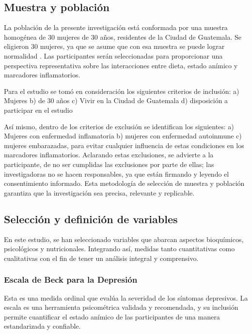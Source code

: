 \documentclass[jou]{apa7}
\begin{document}
	\subsection{Muestra y población}\label{muestra-y-poblaciuxf3n}
	
	La población de la presente investigación está conformada por una
	muestra homogénea de 30 mujeres de 30 años, residentes de la Ciudad de
	Guatemala. Se eligieron 30 mujeres, ya que se asume que con esa muestra
	se puede lograr normalidad \parencite{Hernandez2018}. Las
	participantes serán seleccionadas para proporcionar una perspectiva
	representativa sobre las interacciones entre dieta, estado anímico y
	marcadores inflamatorios.
	
	Para el estudio se tomó en consideración los siguientes criterios de
	inclusión: a) Mujeres b) de 30 años c) Vivir en la Ciudad de Guatemala
	d) disposición a participar en el estudio
	
	Así mismo, dentro de los criterios de exclusión se identifican los
	siguientes: a) Mujeres con enfermedad inflamatoria b) mujeres con
	enfermedad autoinmune c) mujeres embarazadas, para evitar cualquier
	influencia de estas condiciones en los marcadores inflamatorios.
	Aclarando estas exclusiones, se advierte a la participante, de no ser
	cumplidas las exclusiones por parte de ellas; las investigadoras no se
	hacen responsables, ya que están firmando y leyendo el consentimiento
	informado. Esta metodología de selección de muestra y población
	garantiza que la investigación sea precisa, relevante y replicable.
	
	\subsection{Selección y definición de variables}\label{selecciuxf3n-y-definiciuxf3n-de-variables}
	
	En este estudio, se han seleccionado variables que abarcan aspectos
	bioquímicos, psicológicos y nutricionales. Integrando así, medidas tanto
	cuantitativas como cualitativas con el fin de tener un análisis integral
	y comprensivo.\\
	
	
	
	\subsubsection{Escala de Beck para la Depresión}
	Esta es una medida ordinal que evalúa la severidad de los síntomas depresivos. La escala es una herramienta psicométrica validada y recomendada, y su inclusión permite cuantificar el estado anímico de las participantes de una manera estandarizada y confiable.
	
\end{document}
